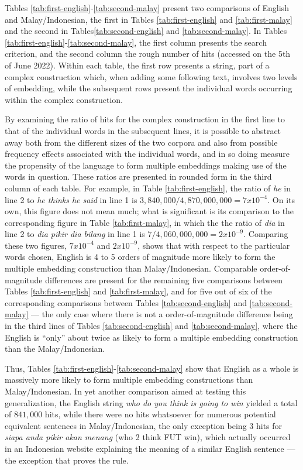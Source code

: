 \documentclass[output=paper,colorlinks,citecolor=brown
]{langscibook}
\begin{document}
Tables \ref{tab:first-english}-\ref{tab:second-malay} present two comparisons of English and Malay/Indonesian, the first in Tables \ref{tab:first-english} and \ref{tab:first-malay} and the second in Tables\ref{tab:second-english} and \ref{tab:second-malay}.  In Tables \ref{tab:first-english}-\ref{tab:second-malay}, the first column presents the search criterion, and the second column the rough number of hits (accessed on the 5th of June 2022).  Within each table, the first row presents a string, part of a complex construction which, when adding some following text, involves two levels of embedding, while the subsequent rows present the individual words occurring within the complex construction.

By examining the ratio of hits for the complex construction in the first line to that of the individual words in the subsequent lines, it is possible to abstract away both from the different sizes of the two corpora and also from possible frequency effects associated with the individual words, and in so doing measure the propensity of the language to form multiple embeddings making use of the words in question.  These ratios are presented in rounded form in the third column of each table.  For example, in Table \ref{tab:first-english}, the ratio of \emph{he} in line 2 to \emph{he thinks he said} in line 1 is $3,840,000 / 4,870,000,000 = 7 x 10^{-4}$.  On its own, this figure does not mean much; what is significant is its comparison to the corresponding figure in Table \ref{tab:first-malay}, in which the the ratio of \emph{dia} in line 2 to \emph{dia pikir dia bilang} in line 1 is $7 / 4,060,000,000 = 2 x 10^{-9}$.  Comparing these two figures, $7 x 10^{-4}$ and $2 x 10^{-9}$, shows that with respect to the particular words chosen, English is 4 to 5 orders of magnitude more likely to form the multiple embedding construction than Malay/Indonesian.  Comparable order-of-magnitude differences are present for the remaining five comparisons between Tables \ref{tab:first-english} and \ref{tab:first-malay}, and for five out of six of the corresponding comparisons between Tables \ref{tab:second-english} and \ref{tab:second-malay} — the only case where there is not a order-of-magnitude difference being in the third lines of Tables \ref{tab:second-english} and \ref{tab:second-malay}, where the English is ``only'' about twice as likely to form a multiple embedding construction than the Malay/Indonesian.

Thus, Tables \ref{tab:first-english}-\ref{tab:second-malay} show that English as a whole is massively more likely to form multiple embedding constructions than Malay/Indonesian.  In yet another comparison aimed at testing this generalization, the English string \emph{who do you think is going to win} yielded a total of $841,000$ hits, while there were no hits whatsoever for numerous potential equivalent sentences in Malay/Indonesian, the only exception being 3 hits for \emph{siapa anda pikir akan menang} (who 2 think FUT win), which actually occurred in an Indonesian website explaining the meaning of a similar English sentence — the exception that proves the rule.
\end{document}
